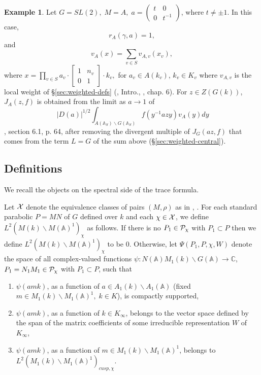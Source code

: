 \documentclass[12pt,letterpaper,openany]{book}
\theoremstyle{plain}
\theoremstyle{definition}
\newtheorem{example}[theorem]{Example}
\theoremstyle{remark}
\theoremstyle{remark}
\begin{document}
\begin{example}
Let $G=SL(2),\;M=A,\;a=\left(
\begin{array}{cc}
t & 0 \\
0 & t^{-1}
\end{array}
\right) $, where $t\neq \pm 1$. In this case,
\[
r_A(\gamma ,a)=1,
\]
and
\[
v_A(x)=\sum_{v\in S}v_{A,v}(x_v),
\]
where $x=\prod_{v\in S}a_v\cdot \left[
\begin{array}{cc}
1 & n_v \\
0 & 1
\end{array}
\right] \cdot k_v,$ for
$a_v\in {A(k_v)}$, $k_v\in {K_v}$
where $v_{A,v}$ is the local weight of \S\ref{sec:weighted-defs}
(\cite{A6}, Intro., \cite{Sho}, chap. 6). For $z\in Z(G(k))$, $J_A(z,f)$ is obtained from the limit as
$a\rightarrow 1$ of
\begin{equation}
\ |D(a)|^{1/2}
\int_{A({\mathbb {A}}_S)\backslash G({\mathbb {A}}_S)}
f(y^{-1} az y)v_A(y)dy
\end{equation}
\cite{Sho}, section 6.1, p. 64, after removing the divergent multiple of
$J_G(az,f)$ that comes from the term $L=G$ of the sum above
(\S\ref{sec:weighted-central}).
\end{example}

\subsection{Definitions}

We recall the objects on the spectral side of the trace formula.


Let ${\cal X}$ denote the equivalence classes of pairs $(M,\rho)$ as in
\cite{A2}, \cite{A3}.
For each standard parabolic $P=MN$ of $G$ defined over $k$
and each $\chi \in {\cal X}$, we define
$L^2(M(k)\backslash M({\mathbb{A}})^1)_\chi $
as follows. If there is no $P_1\in {\cal P}_\chi $
with $P_1\subset P$ then we define
$L^2(M(k)\backslash M({\mathbb{A}})^1)_\chi $ to be $0$.
Otherwise, let
$\Psi (P_1,P,\chi,W )$ denote the space of
all complex-valued functions $\psi :N({\mathbb{A}})M_1(k)\backslash G(%
{\mathbb{A}})\rightarrow {\mathbb C}$, $P_1=N_1M_1\in {\cal P}_\chi $
with $P_1\subset P$, such that

\begin{enumerate}
\item  $\psi (amk)$, as a function of
$a\in A_1(k)\backslash A_1({\mathbb{A}})$ (fixed
$m\in M_1(k)\backslash M_1({\mathbb{A}})^1,\;k\in K$),
is compactly supported,

\item  $\psi (amk)$, as a function of $k\in K_\infty $, belongs to the
vector space defined by the span of the matrix coefficients of some
irreducible representation $W$ of $K_\infty $,

\item  $\psi (amk)$, as a function of $m\in M_1(k)\backslash M_1(\mathbb A)^1$, belongs to
$L^2(M_1(k)\backslash M_1(\mathbb A)^1)_{cusp,\chi }$.
\end{enumerate}
\end{document}
